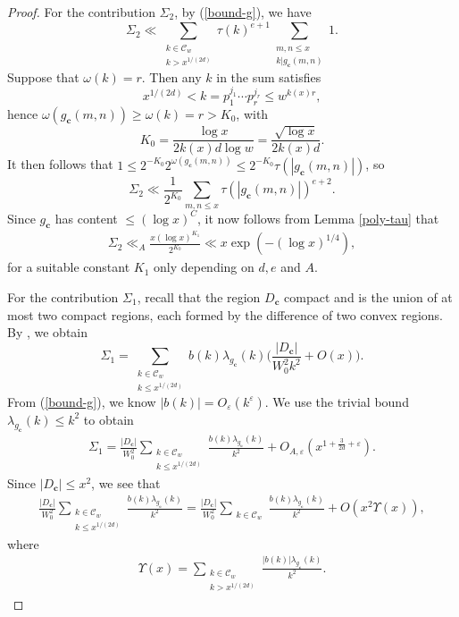 \documentclass[reqno, 11pt]{amsart}
\renewcommand{\leq}{\leqslant}
\renewcommand{\geq}{\geqslant}
\theoremstyle{definition}
\theoremstyle{definition}
\renewcommand{\geq}{\geqslant}
\renewcommand{\leq}{\leqslant}
\newcommand{\norm}[1]{\left\lVert#1\right\rVert}
\newcommand{\eps}{\varepsilon}
\newcommand{\cc}{\mathbf{c}}
\numberwithin{equation}{section}
\begin{document}
\begin{proof}
For the contribution $\Sigma_2$, by (\ref{bound-g}), we have
$$\Sigma_2 \ll \sum_{\substack{k \in \mathcal{C}_w \\ k > x^{1/(2d)}}} \tau(k)^{e+1} \sum_{\substack{m, n \leq x \\ k|g_\cc(m,n)}}1.$$
Suppose that $\omega(k) = r$. Then any $k$ in the sum satisfies
$$x^{1/(2d)} < k = p_1^{j_1} \cdots p_r^{j_r} \leq w^{k(x)r},$$
hence $\omega(g_\cc(m, n)) \geq \omega(k) = r > K_0$, with
$$K_0 = \frac{\log x}{2k(x) d \log w} = \frac{\sqrt{\log x}}{2k(x)d}.$$
It then follows that $1 \leq 2^{-K_0}2^{\omega(g_\cc(m, n))} \leq 2^{-K_0} \tau(|g_\cc(m, n)|)$, so
$$\Sigma_2 \ll \frac{1}{2^{K_0}} \sum_{m,n\leq x} \tau(|g_\cc(m, n)|)^{e+2}.$$
Since $g_\cc$ has content $\leq (\log x)^C$, it now follows from Lemma \ref{poly-tau} that
\begin{align}\label{sum_2}
	\Sigma_2 \ll_A \frac{x(\log x)^{K_1}}{2^{K_0}} \ll x \exp\left(-(\log x)^{1/4} \right), 
\end{align} 
for a suitable constant $K_1$ only depending on $d, e$ and $A$.

For the contribution $\Sigma_1$, recall that the region $D_\cc$ compact and is the union of at most two compact regions, each formed by the difference of two convex regions.
By \cite[Lemma 1]{Sch}, we obtain
$$\Sigma_1 = \sum_{\substack{k \in \mathcal{C}_w \\ k \leq x^{1/(2d)}}} b(k) \lambda_{g_\cc}(k) \bigg( \frac{|D_\cc|}{W_0^2 k^2} + O(x) \bigg).$$
From (\ref{bound-g}), we know $|b(k)| = O_\eps(k^\eps)$. We use the trivial bound $\lambda_{g_\cc}(k) \leq k^2$ to obtain
    \begin{align}\label{BST-9.10}
    	\Sigma_1 = \frac{|D_\cc|}{W_0^2} \sum_{\substack{k \in \mathcal{C}_w \\ k \leq x^{1/(2d)}}} \frac{b(k) \lambda_{g_\cc}(k)}{k^2} + O_{A, \eps}(x^{1 + \frac{3}{2d} + \eps}).
    \end{align}
    Since $|D_\cc| \leq x^2$, we see that
    \begin{align*}
    	\frac{|D_\cc|}{W_0^2}  \sum_{\substack{k \in \mathcal{C}_w \\ k \leq x^{1/(2d)}}} \frac{b(k) \lambda_{g_\cc}(k)}{k^2} = \frac{|D_\cc|}{W_0^2}  \sum_{\substack{k \in \mathcal{C}_w}} \frac{b(k) \lambda_{g_\cc}(k)}{k^2} + O(x^2 \Upsilon(x)),
    \end{align*}
    where
    \begin{align}
    	\Upsilon(x) = \sum_{\substack{k \in \mathcal{C}_w \\ k > x^{1/(2d)}}} \frac{|b(k)| \lambda_{g_\cc}(k)}{k^2}.
    \end{align}
    

\end{proof}
\end{document}
